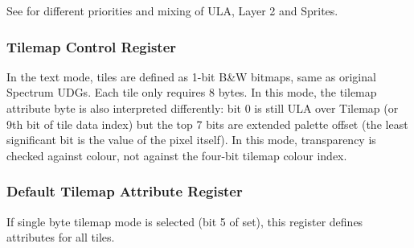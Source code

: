 See  for different priorities and mixing of ULA, Layer 2 and Sprites.


\subsubsection{Tilemap Control Register }

\begin{NextPort}
\end{NextPort}

In the text mode, tiles are defined as 1-bit B\&W bitmaps, same as original Spectrum UDGs. Each tile only requires 8 bytes. In this mode, the tilemap attribute byte is also interpreted differently: bit 0 is still ULA over Tilemap (or 9th bit of tile data index) but the top 7 bits are extended palette offset (the least significant bit is the value of the pixel itself). In this mode, transparency is checked against  colour, not against the four-bit tilemap colour index.


\pagebreak
\subsubsection{Default Tilemap Attribute Register }

If single byte tilemap mode is selected (bit 5 of  set), this register defines attributes for all tiles.

\begin{NextPort}
\end{NextPort}



